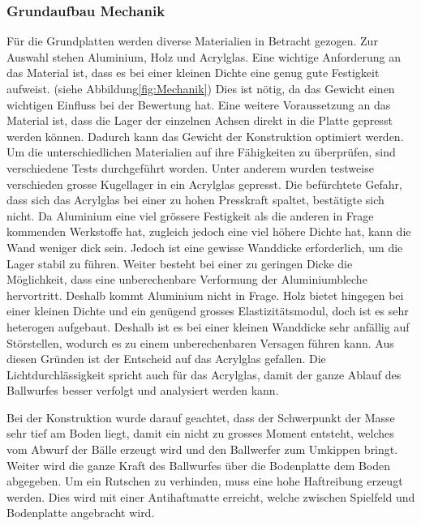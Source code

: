 ﻿\subsubsection{Grundaufbau Mechanik}
Für die Grundplatten werden diverse Materialien in Betracht gezogen. Zur Auswahl stehen Aluminium, Holz und Acrylglas. Eine wichtige Anforderung an das Material ist, dass es bei einer kleinen Dichte eine genug gute Festigkeit aufweist. (siehe Abbildung\ref{fig:Mechanik})
Dies ist nötig, da das Gewicht einen wichtigen Einfluss bei der Bewertung hat. Eine weitere Voraussetzung an das Material ist, dass die Lager der einzelnen Achsen direkt in die Platte gepresst werden können. Dadurch kann das Gewicht der Konstruktion optimiert werden. Um die unterschiedlichen Materialien auf ihre Fähigkeiten zu überprüfen, sind verschiedene Tests durchgeführt worden. Unter anderem wurden testweise verschieden grosse Kugellager in ein Acrylglas gepresst. Die befürchtete Gefahr, dass sich das Acrylglas bei einer zu hohen Presskraft spaltet, bestätigte sich nicht. Da Aluminium eine viel grössere Festigkeit als die anderen in Frage kommenden Werkstoffe hat, zugleich jedoch eine viel höhere Dichte hat, kann die Wand weniger dick sein. Jedoch ist eine gewisse Wanddicke erforderlich, um die Lager stabil zu führen. Weiter besteht bei einer zu geringen Dicke die Möglichkeit, dass eine unberechenbare Verformung der Aluminiumbleche hervortritt. Deshalb kommt Aluminium nicht in Frage. Holz bietet hingegen bei einer kleinen Dichte und ein genügend grosses Elastizitätsmodul, doch ist es sehr heterogen aufgebaut. Deshalb ist es bei einer kleinen Wanddicke sehr anfällig auf Störstellen, wodurch es zu einem unberechenbaren Versagen führen kann. Aus diesen Gründen ist der Entscheid auf das Acrylglas gefallen. Die Lichtdurchlässigkeit spricht auch für das Acrylglas, damit der ganze Ablauf des Ballwurfes besser verfolgt und analysiert werden kann. 

Bei der Konstruktion wurde darauf geachtet, dass der Schwerpunkt der Masse sehr tief am Boden liegt, damit ein nicht zu grosses Moment entsteht, welches vom Abwurf der Bälle erzeugt wird und den Ballwerfer zum Umkippen bringt. Weiter wird die ganze Kraft des Ballwurfes über die Bodenplatte dem Boden abgegeben. Um ein Rutschen zu verhinden, muss eine hohe Haftreibung erzeugt werden. Dies wird mit einer Antihaftmatte erreicht, welche zwischen Spielfeld und Bodenplatte angebracht wird.

